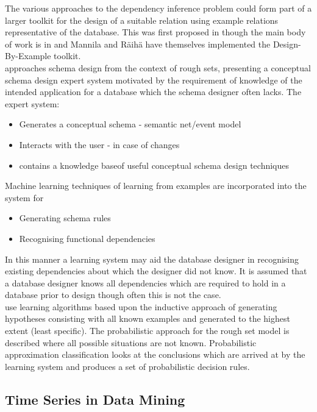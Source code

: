 The various approaches to the dependency inference problem could form part of
a larger toolkit for the design of a suitable relation using example relations 
representative of the database.  This was first proposed in \cite{sm81} though the
main body of work is in \cite{mr86,mr92,km95} and Mannila and R\"{a}ih\"{a}
have themselves implemented the Design-By-Example toolkit.\\

\cite{yz88} approaches schema design from the context of rough sets, presenting
a conceptual schema design expert system motivated by the requirement of 
knowledge of the intended application for a database which the schema designer
often lacks. The expert system:
\begin{itemize}
\item Generates a conceptual schema - semantic net/event model
\item Interacts with the user - in case of changes
\item contains a knowledge baseof useful conceptual schema design techniques
\end{itemize}

Machine learning techniques of learning from examples are incorporated into
the system for
\begin{itemize}
\item Generating schema rules
\item Recognising functional dependencies
\end{itemize}
In this manner a learning system may aid the database designer in
recognising existing dependencies about which the designer did not
know.  It is assumed that a database designer knows all dependencies
which are required to hold in a database prior to design though often
this is not the case.\\

\cite{yz88} use learning algorithms based upon the inductive approach
of generating hypotheses consisting with all known examples and 
generated to the highest extent (least specific).   The probabilistic
approach for the rough set model is described where all possible
situations are not known.  Probabilistic approximation classification
looks at the conclusions which are arrived at by the learning system
and produces a set of probabilistic decision rules.\\

\subsection{Time Series in Data Mining}

